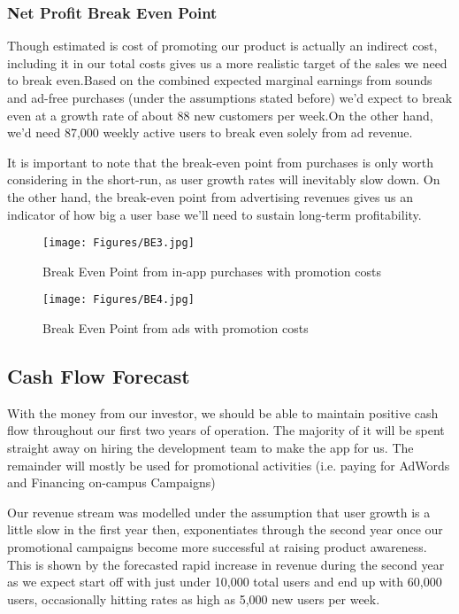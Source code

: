 \documentclass[12pt]{article}
\begin{document}
\subsubsection*{Net Profit Break Even Point}
Though estimated is cost of promoting our product is actually an indirect cost, including it in our total costs gives us a more realistic target of the sales we need to break even.Based on the combined expected marginal earnings from sounds and ad-free purchases (under the assumptions stated before) we'd expect to break even at a growth rate of about 88 new customers per week.On the other hand, we'd need 87,000 weekly active users to break even solely from ad revenue.

It is important to note that the break-even point from purchases is only worth considering in the short-run, as user growth rates will inevitably slow down. On the other hand, the break-even point from advertising revenues gives us an indicator of how big a user base we’ll need to sustain long-term profitability.

\begin{figure}[p]
    \centering
    \texttt{[image: Figures/BE3.jpg]}
    \caption{Break Even Point from in-app purchases with promotion costs}
    \label{fig:BE_NP_Purchases}
\end{figure}

\begin{figure}[p]
    \centering
    \texttt{[image: Figures/BE4.jpg]}
    \caption{Break Even Point from ads with promotion costs}
    \label{fig:BE_NP_Ads}
\end{figure}

\subsection{Cash Flow Forecast}
With the money from our investor, we should be able to maintain positive cash flow throughout our first two years of operation. The majority of it will be spent straight away on hiring the development team to make the app for us. The remainder will mostly be used for promotional activities (i.e. paying for AdWords and Financing on-campus Campaigns)
 
Our revenue stream was modelled under the assumption that user growth is a little slow in the first year then, exponentiates through the second year once our promotional campaigns become more successful at raising product awareness. This is shown by the forecasted rapid increase in revenue during the second year as we expect start off with just under 10,000 total users and end up with 60,000 users, occasionally hitting rates as high as 5,000 new users per week.
 
\end{document}
